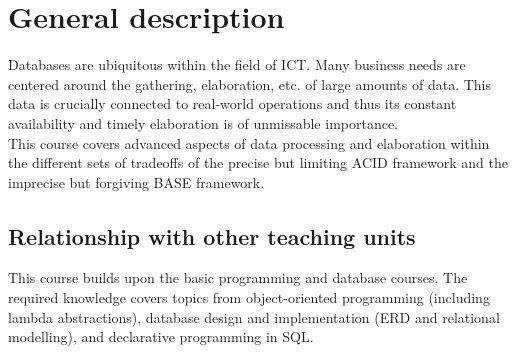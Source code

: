 \section{General description}
	Databases are ubiquitous within the field of ICT. Many business needs are centered around the gathering, elaboration, etc. of large amounts of data. This data is crucially connected to real-world operations and thus its constant availability and timely elaboration is of unmissable importance. \\
		
		This course covers advanced aspects of data processing and elaboration within the different sets of tradeoffs of the precise but limiting ACID framework and the imprecise but forgiving BASE framework. \\

	\subsection{Relationship with other teaching units}
		This course builds upon the basic programming and database courses. The required knowledge covers topics from object-oriented programming (including lambda abstractions), database design and implementation (ERD and relational modelling), and declarative programming in SQL.
